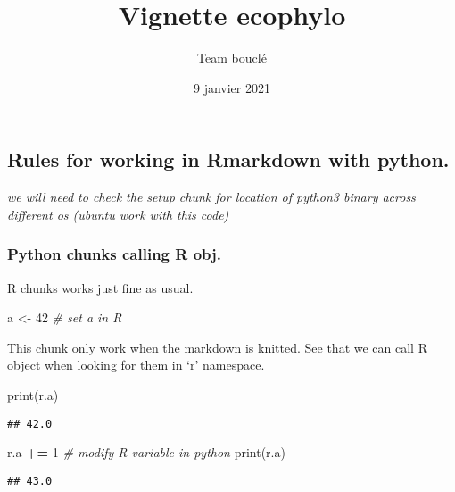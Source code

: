 \documentclass[
]{article}
\title{Vignette ecophylo}
\author{Team bouclé}
\date{9 janvier 2021}
\newenvironment{Shaded}{\begin{snugshade}}{\end{snugshade}}
\newcommand{\BuiltInTok}[1]{#1}
\newcommand{\CommentTok}[1]{\textcolor[rgb]{0.56,0.35,0.01}{\textit{#1}}}
\newcommand{\DecValTok}[1]{\textcolor[rgb]{0.00,0.00,0.81}{#1}}
\newcommand{\NormalTok}[1]{#1}
\newcommand{\OperatorTok}[1]{\textcolor[rgb]{0.81,0.36,0.00}{\textbf{#1}}}
\newcommand{\OtherTok}[1]{\textcolor[rgb]{0.56,0.35,0.01}{#1}}
\begin{document}
\maketitle

\hypertarget{rules-for-working-in-rmarkdown-with-python.}{%
\subsection{Rules for working in Rmarkdown with
python.}\label{rules-for-working-in-rmarkdown-with-python.}}

\emph{we will need to check the setup chunk for location of python3
binary across different os (ubuntu work with this code)}

\hypertarget{python-chunks-calling-r-obj.}{%
\subsubsection{Python chunks calling R
obj.}\label{python-chunks-calling-r-obj.}}

R chunks works just fine as usual.

\begin{Shaded}
\begin{Highlighting}[]
\NormalTok{a }\OtherTok{\textless{}{-}} \DecValTok{42} \CommentTok{\# set a in R}
\end{Highlighting}
\end{Shaded}

This chunk only work when the markdown is knitted. See that we can call
R object when looking for them in `r' namespace.

\begin{Shaded}
\begin{Highlighting}[]
\BuiltInTok{print}\NormalTok{(r.a)}
\end{Highlighting}
\end{Shaded}

\begin{verbatim}
## 42.0
\end{verbatim}

\begin{Shaded}
\begin{Highlighting}[]
\NormalTok{r.a }\OperatorTok{+=} \DecValTok{1} \CommentTok{\# modify R variable in python}
\BuiltInTok{print}\NormalTok{(r.a)}
\end{Highlighting}
\end{Shaded}

\begin{verbatim}
## 43.0
\end{verbatim}
\end{document}
